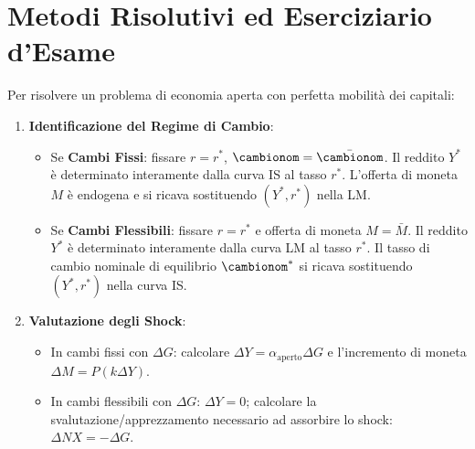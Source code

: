 \section{Metodi Risolutivi ed Eserciziario d'Esame}

\begin{metodo}
Per risolvere un problema di economia aperta con perfetta mobilità dei capitali:
\begin{enumerate}
    \item \textbf{Identificazione del Regime di Cambio}:
    \begin{itemize}
        \item Se \textbf{Cambi Fissi}: fissare $r = r^*$, $\cambionom = \bar{\cambionom}$. Il reddito $Y^*$ è determinato interamente dalla curva IS al tasso $r^*$. L'offerta di moneta $M$ è endogena e si ricava sostituendo $(Y^*, r^*)$ nella LM.
        \item Se \textbf{Cambi Flessibili}: fissare $r = r^*$ e offerta di moneta $M = \bar{M}$. Il reddito $Y^*$ è determinato interamente dalla curva LM al tasso $r^*$. Il tasso di cambio nominale di equilibrio $\cambionom^*$ si ricava sostituendo $(Y^*, r^*)$ nella curva IS.
    \end{itemize}
    \item \textbf{Valutazione degli Shock}:
    \begin{itemize}
        \item In cambi fissi con $\Delta G$: calcolare $\Delta Y = \alpha_{\text{aperto}}\Delta G$ e l'incremento di moneta $\Delta M = P(k \Delta Y)$.
        \item In cambi flessibili con $\Delta G$: $\Delta Y = 0$; calcolare la svalutazione/apprezzamento necessario ad assorbire lo shock: $\Delta NX = -\Delta G$.
    \end{itemize}
\end{enumerate}
\end{metodo}

